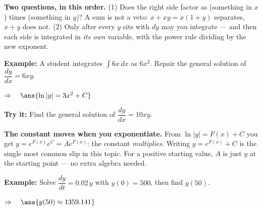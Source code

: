\documentclass[12pt]{article}
\begin{document}


\begin{formulabox}
\textbf{Two questions, in this order.} (1) Does the right side factor as (something in $x$) times (something in $y$)? A sum is not a veto: $x + xy = x(1+y)$ separates, $x + y$ does not. (2) Only after every $y$ sits with $dy$ may you integrate --- and then each side is integrated in \emph{its own} variable, with the power rule dividing by the new exponent.
\end{formulabox}

\begin{examplebox}
\textbf{Example:} \quad A student integrates $\displaystyle\int 6x\,dx$ as $6x^2$. Repair the general solution of $\dfrac{dy}{dx} = 6xy$.

$\Rightarrow\quad \ans{\ln|y| = 3x^2 + C}$
\end{examplebox}

\begin{tryitbox}
\textbf{Try it:} \quad Find the general solution of $\dfrac{dy}{dx} = 10xy$.\\[2pt]
\end{tryitbox}


\begin{formulabox}
\textbf{The constant moves when you exponentiate.} From $\ln|y| = F(x) + C$ you get $y = e^{F(x)}e^{C} = Ae^{F(x)}$: the constant \emph{multiplies}. Writing $y = e^{F(x)} + C$ is the single most common slip in this topic. For a positive starting value, $A$ is just $y$ at the starting point --- no extra algebra needed.
\end{formulabox}

\begin{examplebox}
\textbf{Example:} \quad Solve $\dfrac{dy}{dt} = 0.02\,y$ with $y(0) = 500$, then find $y(50)$.

$\Rightarrow\quad \ans{y(50) \approx 1359.141}$
\end{examplebox}
\end{document}
